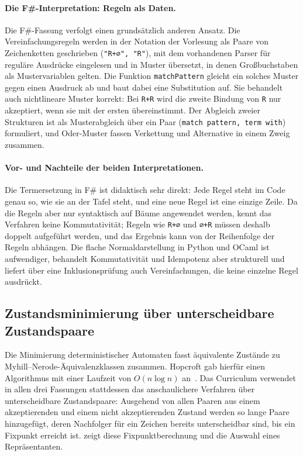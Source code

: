 \paragraph{Die F\#-Interpretation: Regeln als Daten.}
Die F\#-Fassung verfolgt einen grundsätzlich anderen Ansatz.
Die Vereinfachungsregeln werden in der Notation der Vorlesung als Paare von Zeichenketten geschrieben (\texttt{"R+∅", "R"}), mit dem vorhandenen Parser für reguläre Ausdrücke eingelesen und in Muster übersetzt, in denen Großbuchstaben als Mustervariablen gelten.
Die Funktion \texttt{matchPattern} gleicht ein solches Muster gegen einen Ausdruck ab und baut dabei eine Substitution auf.
Sie behandelt auch nichtlineare Muster korrekt: Bei \texttt{R+R} wird die zweite Bindung von \texttt{R} nur akzeptiert, wenn sie mit der ersten übereinstimmt.
Der Abgleich zweier Strukturen ist als Musterabgleich über ein Paar (\texttt{match pattern, term with}) formuliert, und Oder-Muster fassen Verkettung und Alternative in einem Zweig zusammen.

\paragraph{Vor- und Nachteile der beiden Interpretationen.}
Die Termersetzung in F\# ist didaktisch sehr direkt: Jede Regel steht im Code genau so, wie sie an der Tafel steht, und eine neue Regel ist eine einzige Zeile.
Da die Regeln aber nur syntaktisch auf Bäume angewendet werden, kennt das Verfahren keine Kommutativität; Regeln wie \texttt{R+∅} und \texttt{∅+R} müssen deshalb doppelt aufgeführt werden, und das Ergebnis kann von der Reihenfolge der Regeln abhängen.
Die flache Normaldarstellung in Python und OCaml ist aufwendiger, behandelt Kommutativität und Idempotenz aber strukturell und liefert über eine Inklusionsprüfung auch Vereinfachungen, die keine einzelne Regel ausdrückt.

\subsection{Zustandsminimierung über unterscheidbare Zustandspaare}
\label{sec:case_minimize}
Die Minimierung deterministischer Automaten fasst äquivalente Zustände zu Myhill--Nerode-Äquivalenzklassen zusammen.
Hopcroft gab hierfür einen Algorithmus mit einer Laufzeit von $O(n \log n)$ an~\cite{hopcroft1971nlogn}.
Das Curriculum verwendet in allen drei Fassungen stattdessen das anschaulichere Verfahren über unterscheidbare Zustandspaare: Ausgehend von allen Paaren aus einem akzeptierenden und einem nicht akzeptierenden Zustand werden so lange Paare hinzugefügt, deren Nachfolger für ein Zeichen bereits unterscheidbar sind, bis ein Fixpunkt erreicht ist.
 zeigt diese Fixpunktberechnung und die Auswahl eines Repräsentanten.

